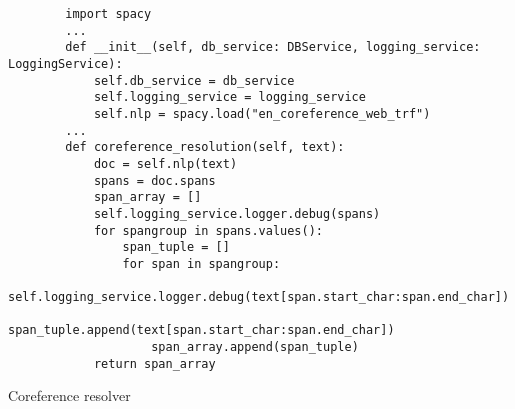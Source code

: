 \begin{listing}
    \begin{verbatim}
        import spacy
        ...
        def __init__(self, db_service: DBService, logging_service: LoggingService):
            self.db_service = db_service
            self.logging_service = logging_service
            self.nlp = spacy.load("en_coreference_web_trf")
        ...
        def coreference_resolution(self, text):
            doc = self.nlp(text)
            spans = doc.spans
            span_array = []
            self.logging_service.logger.debug(spans)
            for spangroup in spans.values():
                span_tuple = []
                for span in spangroup:
                    self.logging_service.logger.debug(text[span.start_char:span.end_char])
                    span_tuple.append(text[span.start_char:span.end_char])
                    span_array.append(span_tuple)
            return span_array
    \end{verbatim}
    \caption[Coreference resolver]{Coreference resolver}
    \label{code:coreference}
\end{listing}
